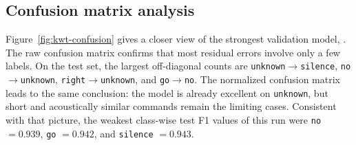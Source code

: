 \documentclass[11pt]{article}
\begin{document}
\begin{table}[b!]
\centering
\caption{Comparison between the paper KWT family and the seven KWT models executed in this project. Ours models used \(10{,}400\) steps with batch size \(512\), whereas the paper models used \(23{,}000\) steps with the same batch size}
\label{tab:kwt-paper-comparison}
\smallskip
\small
{}
\end{table}

\subsection*{Confusion matrix analysis}

Figure~\ref{fig:kwt-confusion} gives a closer view of the strongest validation model, . The raw confusion matrix confirms that most residual errors involve only a few labels. On the test set, the largest off-diagonal counts are \texttt{unknown}\(\rightarrow\)\texttt{silence}, \texttt{no}\(\rightarrow\)\texttt{unknown}, \texttt{right}\(\rightarrow\)\texttt{unknown}, and \texttt{go}\(\rightarrow\)\texttt{no}. The normalized confusion matrix leads to the same conclusion: the model is already excellent on \texttt{unknown}, but short and acoustically similar commands remain the limiting cases. Consistent with that picture, the weakest class-wise test F1 values of this run were \texttt{no} \(=0.939\), \texttt{go} \(=0.942\), and \texttt{silence} \(=0.943\).
\end{document}
